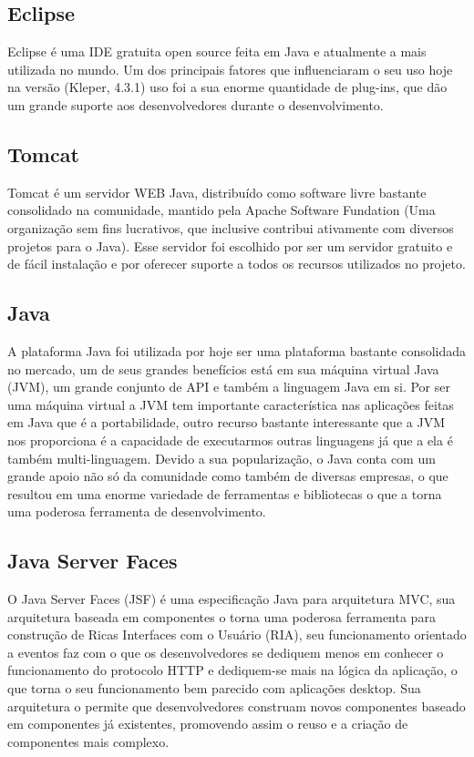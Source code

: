 \subsection{Eclipse}
\label{sec:eclipse}

Eclipse é uma IDE gratuita open source feita em Java e atualmente a mais
utilizada no mundo. Um dos principais fatores que influenciaram o seu uso hoje
na versão (Kleper, 4.3.1) uso foi a sua enorme quantidade de plug-ins, que dão
um grande suporte aos desenvolvedores durante o desenvolvimento.

\subsection{Tomcat}
\label{sec:tomcat}

Tomcat é um servidor WEB Java, distribuído como software livre bastante
consolidado na comunidade, mantido pela Apache Software Fundation (Uma
organização sem fins lucrativos, que inclusive contribui ativamente com diversos
projetos para o Java). Esse servidor foi escolhido por ser um servidor gratuito
e de fácil instalação e por oferecer suporte a todos os recursos utilizados no
projeto.

\subsection{Java}
\label{sec:java}

A plataforma Java foi utilizada por hoje ser uma plataforma bastante consolidada
no mercado, um de seus grandes benefícios está em sua máquina virtual Java
(JVM), um grande conjunto de API e também a linguagem Java em si. Por ser uma
máquina virtual a JVM tem  importante característica nas aplicações feitas em
Java que é a portabilidade, outro recurso bastante interessante que a JVM nos
proporciona é a capacidade de executarmos outras linguagens já que a ela é
também multi-linguagem. Devido a sua popularização, o Java conta com um grande
apoio não só da comunidade como também de diversas empresas, o que resultou em
uma enorme variedade de ferramentas e bibliotecas o que a torna uma poderosa
ferramenta de desenvolvimento.

\subsection{Java Server Faces}
\label{sec:javaserverfaces}

O Java Server Faces (JSF) é uma especificação Java para arquitetura MVC, sua
arquitetura baseada em componentes o torna uma poderosa ferramenta para
construção de Ricas Interfaces com o Usuário (RIA), seu funcionamento orientado
a eventos faz com o que os desenvolvedores se dediquem menos em conhecer o
funcionamento do protocolo HTTP e dediquem-se mais na lógica da aplicação, o que
torna o seu funcionamento bem parecido com aplicações desktop. Sua arquitetura o
permite que desenvolvedores construam novos componentes baseado em componentes
já existentes, promovendo assim o reuso e a criação de componentes mais complexo.


